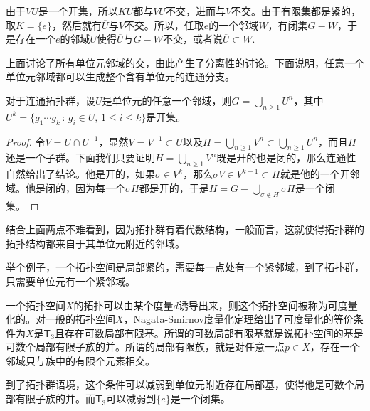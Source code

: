 由于$VU$是一个开集，所以$\overline{KU}$都与$VU$不交，进而与$V$不交。由于有限集都是紧的，取$K=\{e\}$，然后就有$\overline{U}$与$V$不交。所以，任取$e$的一个邻域$W$，有闭集$G-W$，于是存在一个$e$的邻域$U$使得$\overline{U}$与$G-W$不交，或者说$\overline{U}\subset W$.

上面讨论了所有单位元邻域的交，由此产生了分离性的讨论。下面说明，任意一个单位元邻域都可以生成整个含有单位元的连通分支。

\begin{lem}\label{lem:116}
对于连通拓扑群，设$U$是单位元的任意一个邻域，则$G=\bigcup_{n\geq 1}U^n$，其中$U^k=\{g_1\cdots g_k\,:\,g_i\in U,\, 1\leq i \leq k\}$是开集。
\end{lem}

\begin{proof}
令$V=U\cap U^{-1}$，显然$V=V^{-1}\subset U$以及$H=\bigcup_{n\geq 1}V^n\subset \bigcup_{n\geq 1}U^n$，而且$H$还是一个子群。下面我们只要证明$H=\bigcup_{n\geq 1}V^n$既是开的也是闭的，那么连通性自然给出了结论。他是开的，如果$\sigma\in V^k$，那么$\sigma V\in V^{k+1}\subset H$就是他的一个开邻域。他是闭的，因为每一个$\sigma H$都是开的，于是$H=G-\bigcup_{\sigma\notin H}\sigma H$是一个闭集。
\end{proof}

结合上面两点不难看到，因为拓扑群有着代数结构，一般而言，这就使得拓扑群的拓扑结构都来自于其单位元附近的邻域。

举个例子，一个拓扑空间是局部紧的，需要每一点处有一个紧邻域，到了拓扑群，只需要单位元有一个紧邻域。

\begin{para}
一个拓扑空间$X$的拓扑可以由某个度量$d$诱导出来，则这个拓扑空间被称为可度量化的。对一般的拓扑空间$X$，Nagata-Smirnov度量化定理给出了可度量化的等价条件为$X$是$\mathsf{T}_3$且存在可数局部有限基。所谓的可数局部有限基就是说拓扑空间的基是可数个局部有限子族的并。所谓的局部有限族，就是对任意一点$p\in X$，存在一个邻域只与族中的有限个元素相交。

到了拓扑群语境，这个条件可以减弱到单位元附近存在局部基，使得他是可数个局部有限子族的并。而$\mathsf{T}_3$可以减弱到$\{e\}$是一个闭集。
\end{para}

